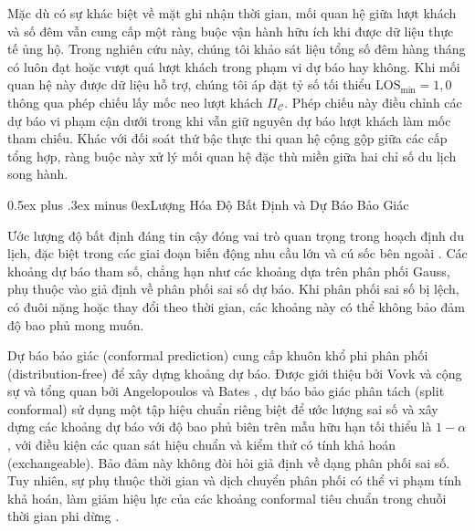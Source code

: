 \documentclass[10pt,journal,compsoc]{IEEEtran}
\makeatletter
\def\subsection{\@startsection{subsection}{2}{\z@}{-1.8ex plus -0.6ex minus -0.3ex}%
{0.5ex plus .3ex minus 0ex}{\normalfont\normalsize\rmfamily\bfseries}}
\makeatother
\begin{document}
Mặc dù có sự khác biệt về mặt ghi nhận thời gian, mối quan hệ giữa lượt khách và số đêm vẫn cung cấp một ràng buộc vận hành hữu ích khi được dữ liệu thực tế ủng hộ. Trong nghiên cứu này, chúng tôi khảo sát liệu tổng số đêm hàng tháng có luôn đạt hoặc vượt quá lượt khách trong phạm vi dự báo hay không. Khi mối quan hệ này được dữ liệu hỗ trợ, chúng tôi áp đặt tỷ số tối thiểu $\text{LOS}_{\min}=1{,}0$ thông qua phép chiếu lấy mốc neo lượt khách $\Pi_{\mathcal{C}}$. Phép chiếu này điều chỉnh các dự báo vi phạm cận dưới trong khi vẫn giữ nguyên dự báo lượt khách làm mốc tham chiếu. Khác với đối soát thứ bậc thực thi quan hệ cộng gộp giữa các cấp tổng hợp, ràng buộc này xử lý mối quan hệ đặc thù miền giữa hai chỉ số du lịch song hành.

\subsection{Lượng Hóa Độ Bất Định và Dự Báo Bảo Giác}

Ước lượng độ bất định đáng tin cậy đóng vai trò quan trọng trong hoạch định du lịch, đặc biệt trong các giai đoạn biến động nhu cầu lớn và cú sốc bên ngoài \cite{gossling2020pandemics}. Các khoảng dự báo tham số, chẳng hạn như các khoảng dựa trên phân phối Gauss, phụ thuộc vào giả định về phân phối sai số dự báo. Khi phân phối sai số bị lệch, có đuôi nặng hoặc thay đổi theo thời gian, các khoảng này có thể không bảo đảm độ bao phủ mong muốn.

Dự báo bảo giác (conformal prediction) cung cấp khuôn khổ phi phân phối (distribution-free) để xây dựng khoảng dự báo. Được giới thiệu bởi Vovk và cộng sự \cite{vovk2005algorithmic} và tổng quan bởi Angelopoulos và Bates \cite{angelopoulos2021conformal}, dự báo bảo giác phân tách (split conformal) sử dụng một tập hiệu chuẩn riêng biệt để ước lượng sai số và xây dựng các khoảng dự báo với độ bao phủ biên trên mẫu hữu hạn tối thiểu là $1-\alpha$, với điều kiện các quan sát hiệu chuẩn và kiểm thử có tính khả hoán (exchangeable). Bảo đảm này không đòi hỏi giả định về dạng phân phối sai số. Tuy nhiên, sự phụ thuộc thời gian và dịch chuyển phân phối có thể vi phạm tính khả hoán, làm giảm hiệu lực của các khoảng conformal tiêu chuẩn trong chuỗi thời gian phi dừng \cite{barber2023conformal}.
\end{document}
